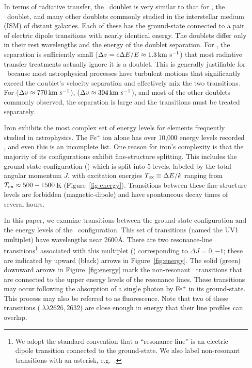 \documentclass[12pt,preprint]{aastex}
\begin{document}
In terms of radiative transfer, the 
\mgiid\ doublet is very similar to that for 
\lya, the \naid\ doublet, and many other doublets commonly
studied in the interstellar medium (ISM) of distant galaxies.  
Each of these has the ground-state connected to a pair of electric
dipole transitions with nearly identical energy.
The doublets differ only in 
their rest wavelengths and the energy of the doublet separation. 
For  \lya, the
separation is sufficiently small ($\Delta v = c \Delta E / E \approx
1.3 \, {\rm km~s^{-1}}$) that most radiative transfer treatments actually ignore it
is a doublet.
This is generally justifiable for \lya\ because 
most astrophysical processes have turbulent motions that
significantly exceed the doublet's velocity separation and effectively mix the
two transitions.  For  ($\Delta v \approx 770 \, {\rm km~s^{-1}}$),  
 ($\Delta v \approx 304 \, {\rm km~s^{-1}}$), and most of the other doublets
commonly observed, the separation is large and the transitions
must be treated separately.  

Iron exhibits the most complex set of energy levels for elements
frequently studied in astrophysics.  The Fe$^+$ ion alone has over
10,000 energy levels recorded \citep{iron}, and even this is an
incomplete list.  
One reason for iron's complexity is
that the majority of its configurations exhibit fine-structure splitting.
This includes the ground-state configuration (\aconfig) which is split
into 5 levels, 
labeled by the total angular momentum $J$, 
with excitation energies $T_{\rm ex} \equiv \Delta E / k$ ranging from
$T_{\rm ex} \approx 500-1500$\,K (Figure~\ref{fig:energy}).  
Transitions between these fine-structure levels are 
forbidden (magnetic-dipole) and have spontaneous decay times of several hours.  

In this paper, we examine transitions between the ground-state
configuration and the energy levels of the \zconfig\
configuration.  This set of transitions (named the
UV1 multiplet) have wavelengths near 2600\AA.
There are two resonance-line transitions\footnote{We adopt the
  standard convention that a ``resonance line'' is an electric-dipole
  transition connected to the ground-state.  We also label
  non-resonant transitions with an asterisk, e.g.\ \feiic.} 
associated with this multiplet (\feiid)
corresponding to $\Delta J = 0, -1$; these are indicated by upward (black) arrows
in Figure~\ref{fig:energy}. The solid (green) downward
arrows in Figure~\ref{fig:energy} mark the non-resonant \feiis\
transitions that are connected to
the upper energy levels of the resonance lines.  These transitions may
occur following the absorption of a single photon by Fe$^+$ in its
ground-state.   This process may also be referred to as fluorescence.
Note that two of these transitions (\feiis$\; \lambda\lambda 2626, 2632$) are
close enough in energy that their line profiles can overlap.
\end{document}
